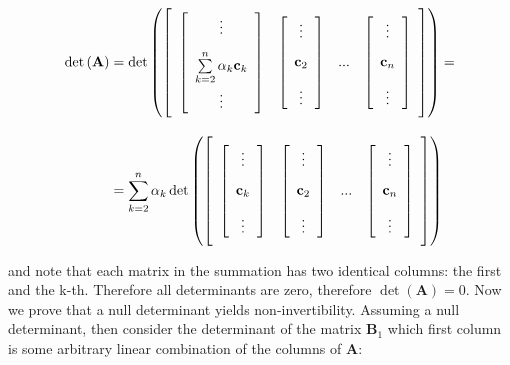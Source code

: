 \begin{align}
	\det\left(\mathbf{A}\right) &= \det\left( \left[\raisebox{15mm}{} \begin{array}{cccc} \left[\begin{array}{c} \vdots \\[3mm] \sum\limits_{k=2}^n \alpha_k\mathbf{c}_k \\[3mm] \vdots \end{array}\right] & \left[\begin{array}{c} \vdots \\[3mm] \mathbf{c}_2 \\[3mm] \vdots \end{array}\right] & ... & \left[\begin{array}{c} \vdots \\[3mm] \mathbf{c}_n \\[3mm] \vdots \end{array}\right]\end{array}\right]\right) = \\[3mm]
%
	&= \sum\limits_{k=2}^n \alpha_k\det\left( \left[\raisebox{15mm}{} \begin{array}{cccc} \left[\begin{array}{c} \vdots \\[3mm] \mathbf{c}_k \\[3mm] \vdots \end{array}\right] & \left[\begin{array}{c} \vdots \\[3mm] \mathbf{c}_2 \\[3mm] \vdots \end{array}\right] & ... & \left[\begin{array}{c} \vdots \\[3mm] \mathbf{c}_n \\[3mm] \vdots \end{array}\right]\end{array}\right]\right) 
\end{align}

	\noindent and note that each matrix in the summation has two identical columns: the first and the k-th. Therefore all determinants are zero, therefore $\det\left(\mathbf{A}\right) = 0$. Now we prove that a null determinant yields non-invertibility. Assuming a null determinant, then consider the determinant of the matrix $\mathbf{B}_1$ which first column is some arbitrary linear combination of the columns of $\mathbf{A}$:

